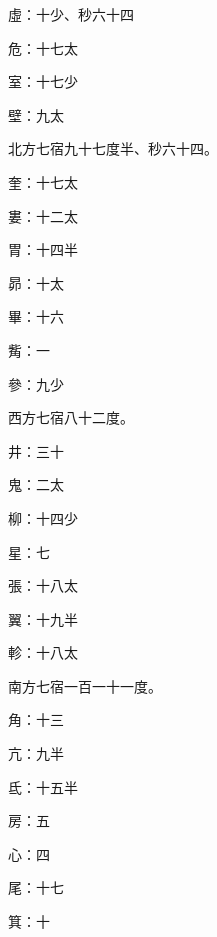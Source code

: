 \begin{pinyinscope}
 虛：十少、秒六十四



 危：十七太



 室：十七少



 壁：九太



 北方七宿九十七度半、秒六十四。



 奎：十七太



 婁：十二太



 胃：十四半



 昴：十太



 畢：十六



 觜：一



 參：九少



 西方七宿八十二度。



 井：三十



 鬼：二太



 柳：十四少



 星：七



 張：十八太



 翼：十九半



 軫：十八太



 南方七宿一百一十一度。



 角：十三



 亢：九半



 氐：十五半



 房：五



 心：四



 尾：十七



 箕：十




\end{pinyinscope}

